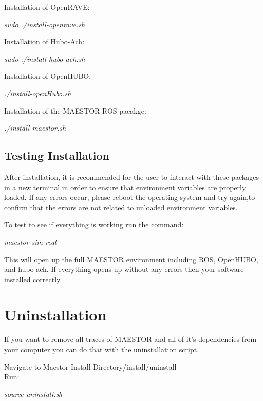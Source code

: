 \documentclass[12pt]{article}
\begin{document}
Installation of OpenRAVE:
\begin{center}
	\textit{sudo ./install-openrave.sh}
\end{center}

Installation of Hubo-Ach:
\begin{center}
	\textit{	sudo ./install-hubo-ach.sh}
\end{center}
	
Installation of OpenHUBO:
\begin{center}
	\textit{./install-openHubo.sh}
\end{center}

Installation of the MAESTOR ROS pacakge:
\begin{center}
	\textit{./install-maestor.sh}
\end{center}
	
\subsection{Testing Installation}

After installation, it is recommended for the user to interact with these packages in a new terminal in order to ensure that environment variables are properly loaded. If any errors occur, please reboot the operating system and try again,to confirm that the errors are not related to unloaded environment variables.

To test to see if everything is working run the command:

\begin{center}
	\textit{maestor sim-real}
\end{center} 

This will open up the full MAESTOR environment including ROS, OpenHUBO, and hubo-ach. If everything opens up without any errors then your software installed correctly. 
	
\section{Uninstallation}

If you want to remove all traces of MAESTOR and all of it's dependencies from your computer you can do that with the uninstallation script.

Navigate to Maestor-Install-Directory/install/uninstall\\
Run:
\begin{center}
	\textit{	source uninstall.sh}
\end{center}
\end{document}
